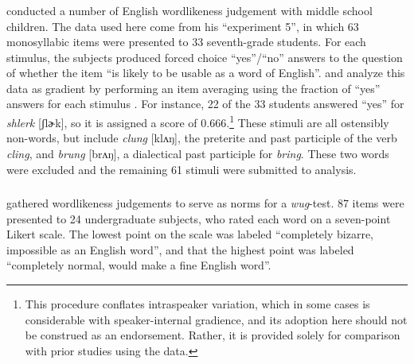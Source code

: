 \subsubsection{\citealt{Scholes1966}}

\citet{Scholes1966} conducted a number of English wordlikeness judgement with middle school children. The data used here come from his ``experiment 5'', in which 63 monosyllabic items were presented to 33 seventh-grade students. For each stimulus, the subjects produced forced choice ``yes''/``no'' answers to the question of whether the item ``is likely to be usable as a word of English''. \citet{Hayes2008a} and \citet{Albright2009a} analyze this data as gradient by performing an item averaging using the fraction of ``yes'' answers for each stimulus \citep[see also][]{Pierrehumbert1994,Coleman1997,Frisch2000}. For instance, 22 of the 33 students answered ``yes'' for \emph{shlerk} [ʃlɚk], so it is assigned a score of $0.666$.\footnote{This procedure conflates intraspeaker variation, which in some cases is considerable \citep{Shademan2007} with speaker-internal gradience, and its adoption here should not be construed as an endorsement. Rather, it is provided solely for comparison with prior studies using the \citeauthor{Scholes1966} data.} These stimuli are all ostensibly non-words, but include \emph{clung} [klʌŋ], the preterite and past participle of the verb \emph{cling}, and \emph{brung} [brʌŋ], a dialectical past participle for \emph{bring}. These two words were excluded and the remaining 61 stimuli were submitted to analysis. 

\subsubsection{\citealt{Albright2003b}}

\citet{Albright2003b} gathered wordlikeness judgements to serve as norms for a \emph{wug}-test. 87 items were presented to 24 undergraduate subjects, who rated each word on a seven-point Likert scale. The lowest point on the scale was labeled ``completely bizarre, impossible as an English word'', and that the highest point was labeled ``completely normal, would make a fine English word''.

